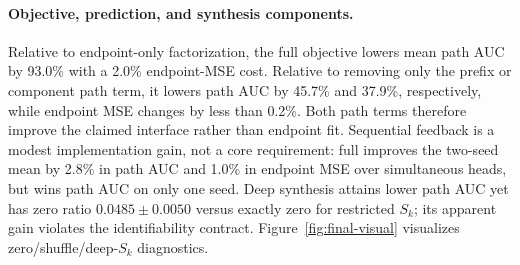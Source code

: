 \begin{table}[t]
  \centering
  \small
  \caption{Matched two-seed component ablations on ImageNet-64 HF. Lower is
  better for endpoint MSE, path AUC, and zero ratio; higher effective K indicates
  broader component use. All path values use the same progress-$1.5$ target.}
  \label{tab:component-ablation}
\end{table}

\paragraph{Objective, prediction, and synthesis components.}
Relative to endpoint-only factorization, the full objective lowers mean path AUC
by 93.0\% with a 2.0\% endpoint-MSE cost. Relative to removing only the prefix
or component path term, it lowers path AUC by 45.7\% and 37.9\%, respectively,
while endpoint MSE changes by less than 0.2\%. Both path terms therefore improve
the claimed interface rather than endpoint fit. Sequential feedback is a modest
implementation gain, not a core requirement: full improves the two-seed mean by
2.8\% in path AUC and 1.0\% in endpoint MSE over simultaneous heads, but wins
path AUC on only one seed. Deep synthesis attains lower path AUC yet has zero
ratio $0.0485\pm0.0050$ versus exactly zero for restricted $S_k$; its apparent
gain violates the identifiability contract. Figure~\ref{fig:final-visual}
visualizes zero/shuffle/deep-$S_k$ diagnostics.

